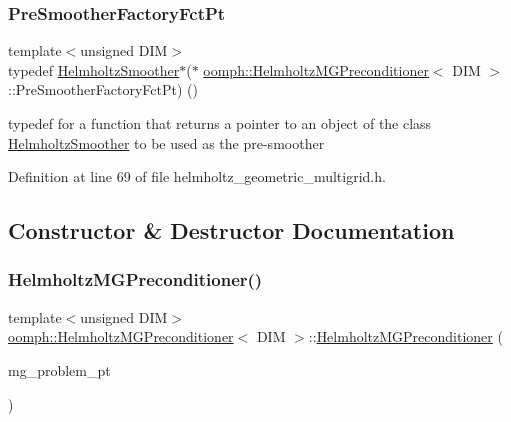 \subsubsection{\texorpdfstring{Pre\+Smoother\+Factory\+Fct\+Pt}{PreSmootherFactoryFctPt}}
{\footnotesize\ttfamily template$<$unsigned D\+IM$>$ \\
typedef \hyperlink{classoomph_1_1HelmholtzSmoother}{Helmholtz\+Smoother}$\ast$($\ast$ \hyperlink{classoomph_1_1HelmholtzMGPreconditioner}{oomph\+::\+Helmholtz\+M\+G\+Preconditioner}$<$ D\+IM $>$\+::Pre\+Smoother\+Factory\+Fct\+Pt) ()}



typedef for a function that returns a pointer to an object of the class \hyperlink{classoomph_1_1HelmholtzSmoother}{Helmholtz\+Smoother} to be used as the pre-\/smoother 



Definition at line 69 of file helmholtz\+\_\+geometric\+\_\+multigrid.\+h.



\subsection{Constructor \& Destructor Documentation}
\mbox{\label{classoomph_1_1HelmholtzMGPreconditioner_a8a91f0e5891cf326143e83071073e01d}} 
\subsubsection{\texorpdfstring{Helmholtz\+M\+G\+Preconditioner()}{HelmholtzMGPreconditioner()}}
{\footnotesize\ttfamily template$<$unsigned D\+IM$>$ \\
\hyperlink{classoomph_1_1HelmholtzMGPreconditioner}{oomph\+::\+Helmholtz\+M\+G\+Preconditioner}$<$ D\+IM $>$\+::\hyperlink{classoomph_1_1HelmholtzMGPreconditioner}{Helmholtz\+M\+G\+Preconditioner} (\begin{DoxyParamCaption}\item[{\hyperlink{classoomph_1_1HelmholtzMGProblem}{Helmholtz\+M\+G\+Problem} $\ast$}]{mg\+\_\+problem\+\_\+pt }\end{DoxyParamCaption})\hspace{0.3cm}{\ttfamily [inline]}}



